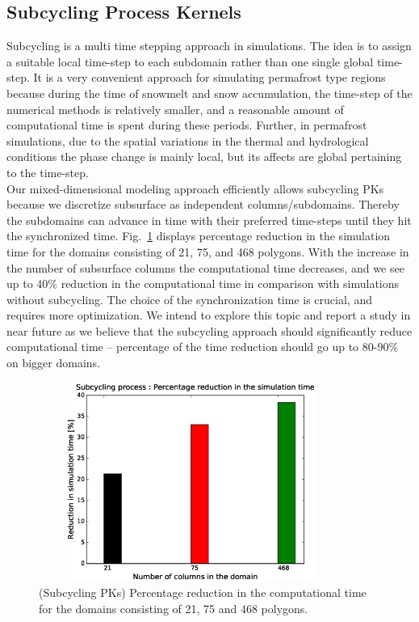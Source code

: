 \documentclass[review]{elsarticle}
\begin{document}
\subsection{Subcycling Process Kernels}
Subcycling is a multi time stepping approach in simulations. The idea is to assign a suitable local time-step to each subdomain rather than one single global time-step. It is a very convenient approach for simulating permafrost type regions because during the time of snowmelt and snow accumulation, the time-step of the numerical methods is relatively smaller, and a reasonable amount of computational time is spent during these periods. Further, in permafrost simulations, due to the spatial variations in the thermal and hydrological conditions the phase change is mainly local, but its affects are global pertaining to the time-step. \\
Our mixed-dimensional modeling approach efficiently allows subcycling PKs because we discretize subsurface as independent columns/subdomains. Thereby the subdomains can advance in time with their preferred time-steps until they hit the synchronized time. Fig.~\ref{subcycle-time-reduciton} displays percentage reduction in the simulation time for the domains consisting of 21, 75, and 468 polygons. With the increase in the number of subsurface columns the computational time decreases, and we see up to 40\% reduction in the computational time in comparison with simulations without subcycling. The choice of the synchronization time is crucial, and requires more optimization. We intend to explore this topic and report a study in near future as we believe that the subcycling approach should significantly reduce computational time -- percentage of the time reduction should go up to 80-90\% on bigger domains.

\begin{figure}[!htpb]
\centering
\includegraphics[height = 6.5cm, width=10cm]{figures/subcycle-time-reduciton.eps}
\caption{(Subcycling PKs) Percentage reduction in the computational time for the domains consisting of 21, 75 and 468 polygons. }
\label{subcycle-time-reduciton}
\end{figure}
\end{document}
